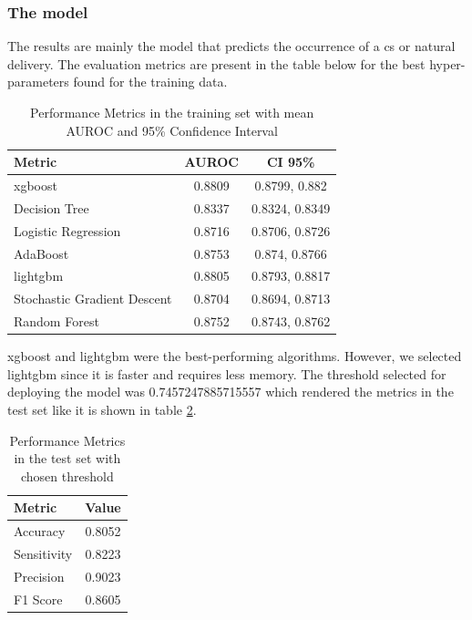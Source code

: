 \subsubsection{The model}
The results are mainly the model that predicts the occurrence of a \ac{cs} or natural delivery. The evaluation metrics are present in the table below for the best hyper-parameters found for the training data.

\begin{table}[htbp]
  \centering
  \caption[Performance Metrics in the training set]{Performance Metrics in the training set with mean AUROC and 95\% Confidence Interval}
  \label{tab:performancemetricsauc}
  \renewcommand{\arraystretch}{1.5} %
  \setlength{\tabcolsep}{12pt} %
  \begin{tabular}{lcc}
    \hline
    \textbf{Metric} & \textbf{AUROC} & \textbf{CI 95\%} \\
    \hline
    xgboost & 0.8809 & 0.8799, 0.882 \\  
    Decision Tree & 0.8337 & 0.8324, 0.8349 \\
    Logistic Regression & 0.8716 & 0.8706, 0.8726 \\
    AdaBoost & 0.8753 & 0.874, 0.8766 \\ 
    lightgbm & 0.8805 & 0.8793, 0.8817 \\ 
    Stochastic Gradient Descent & 0.8704 & 0.8694, 0.8713 \\ 
    Random Forest & 0.8752 & 0.8743, 0.8762 \\  
    \hline
  \end{tabular}
\end{table}

\ac{xgboost} and \ac{lightgbm} were the best-performing algorithms. However, we selected \ac{lightgbm} \cite{lightgbm} since it is faster and requires less memory. The threshold selected for deploying the model was 0.7457247885715557 which rendered the metrics in the test set like it is shown in table \ref{tab:performancemetricsthreshold}.

\begin{table}[htbp]
  \centering
\caption{Performance Metrics in the test set with chosen threshold}
\label{tab:performancemetricsthreshold}
\renewcommand{\arraystretch}{1.5} %
\setlength{\tabcolsep}{12pt} %
\begin{tabular}{lc}
    \hline
    \textbf{Metric} & \textbf{Value} \\
    \hline
    Accuracy & 0.8052 \\
    Sensitivity & 0.8223 \\
    Precision & 0.9023 \\
    F1 Score & 0.8605 \\
    \hline
  \end{tabular}
\end{table}




